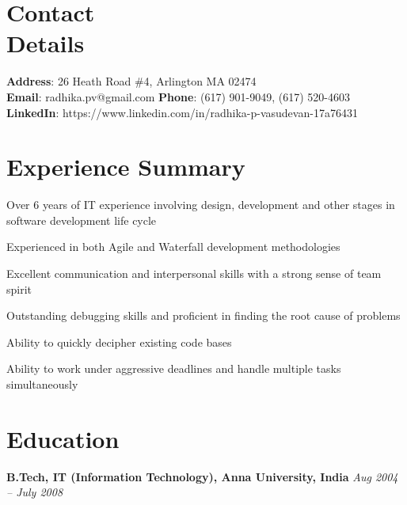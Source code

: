 \documentclass[margin]{resume}
\begin{document}
\begin{resume}

    \section{\mysidestyle Contact\\ Details}

    \textbf{Address}: 26 Heath Road \#4, Arlington MA 02474  \\ \textbf{Email}: radhika.pv@gmail.com   \hfill \textbf{Phone}: (617) 901-9049, (617) 520-4603         \\
    \textbf{LinkedIn}: https://www.linkedin.com/in/radhika-p-vasudevan-17a76431\\

			\vspace{-7mm}
    \section{\mysidestyle Experience Summary}
		\begin{list2}
    \item Over 6 years of IT experience involving design, development and other stages in software development life cycle
    \item Experienced in both Agile and Waterfall development methodologies
    \item Excellent communication and interpersonal skills with a strong sense of team spirit
    \item Outstanding debugging skills and proficient in finding the root cause of problems
    \item Ability to quickly decipher existing code bases
		\item Ability to work under aggressive deadlines and handle multiple tasks simultaneously
		\end{list2}

			\vspace{-3mm}
\section{\mysidestyle Education}
\textbf{B.Tech, IT (Information Technology), Anna University, India} \hfill \textit{Aug 2004 -- July 2008}\\


\end{resume}
\end{document}
